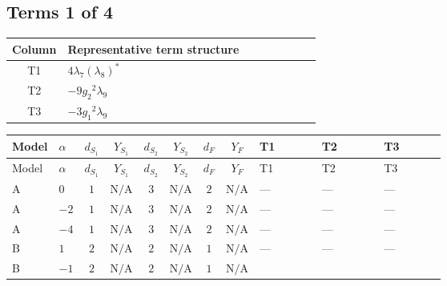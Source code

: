 \documentclass[8pt]{article}
\begin{document}
\begin{landscape}
\subsection*{Terms 1 of 4}
\begin{center}
\begin{tabular}{@{}c >{\raggedright\arraybackslash}p{0.82\linewidth}@{}}
\toprule
Column & Representative term structure \\
\midrule
T1 & \(\displaystyle 4 {\lambda_{7}} \left({\lambda_{8}}\right)^{*}\) \\
\midrule
T2 & \(\displaystyle -9 {g_2}^2 {\lambda_{9}}\) \\
\midrule
T3 & \(\displaystyle -3 {g_1}^2 {\lambda_{9}}\) \\
\midrule
\bottomrule
\end{tabular}
\end{center}
\smallskip
\tiny
\begin{longtable}{@{}llcccccc >{\raggedright\arraybackslash}p{0.21\linewidth} >{\raggedright\arraybackslash}p{0.21\linewidth} >{\raggedright\arraybackslash}p{0.21\linewidth}@{}}
\toprule
Model & $\alpha$ & $d_{S_1}$ & $Y_{S_1}$ & $d_{S_2}$ & $Y_{S_2}$ & $d_F$ & $Y_F$ & T1 & T2 & T3 \\
\midrule
\endfirsthead
\toprule
Model & $\alpha$ & $d_{S_1}$ & $Y_{S_1}$ & $d_{S_2}$ & $Y_{S_2}$ & $d_F$ & $Y_F$ & T1 & T2 & T3 \\
\midrule
\endhead
A & $0$ & $1$ & $\text{N/A}$ & $3$ & $\text{N/A}$ & $2$ & $\text{N/A}$ & --- & --- & --- \\
\midrule
A & $-2$ & $1$ & $\text{N/A}$ & $3$ & $\text{N/A}$ & $2$ & $\text{N/A}$ & --- & --- & --- \\
\midrule
A & $-4$ & $1$ & $\text{N/A}$ & $3$ & $\text{N/A}$ & $2$ & $\text{N/A}$ & --- & --- & --- \\
\midrule
B & $1$ & $2$ & $\text{N/A}$ & $2$ & $\text{N/A}$ & $1$ & $\text{N/A}$ & --- & --- & --- \\
\midrule
B & $-1$ & $2$ & $\text{N/A}$ & $2$ & $\text{N/A}$ & $1$ & $\text{N/A}$ & \scriptsize\adjustbox{max width=\linewidth}{$\begin{gathered} 4 {\lambda_{7}} \left({\lambda_{8}}\right)^{*}\end{gathered}$} & \scriptsize\adjustbox{max width=\linewidth}{$\begin{gathered} -9 {g_2}^2 {\lambda_{9}}\end{gathered}$} & \scriptsize\adjustbox{max width=\linewidth}{$\begin{gathered} -3 {g_1}^2 {\lambda_{9}}\end{gathered}$} \\

\end{longtable}
\end{landscape}
\end{document}
